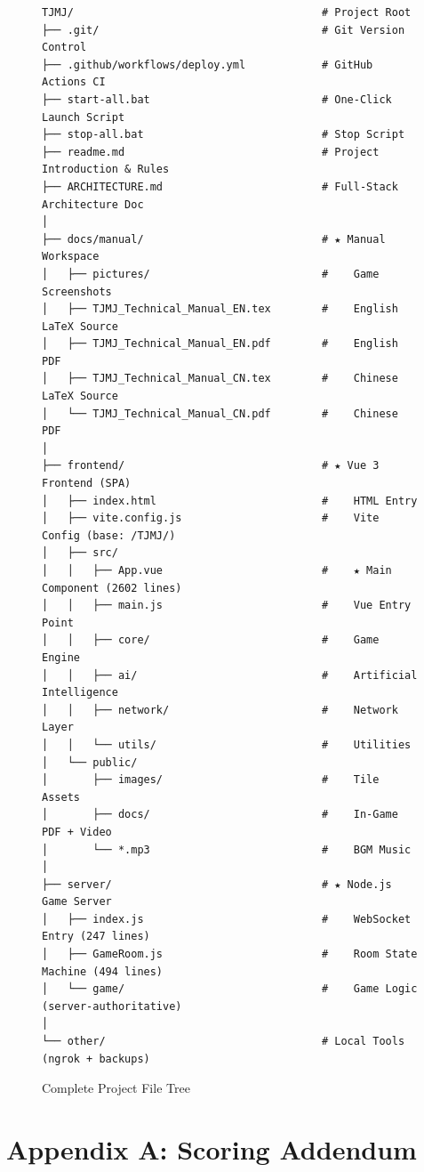 \documentclass[11pt,a4paper]{article}
\begin{document}
\begin{figure}[H]
\centering
\small
\begin{verbatim}
TJMJ/                                       # Project Root
├── .git/                                   # Git Version Control
├── .github/workflows/deploy.yml            # GitHub Actions CI
├── start-all.bat                           # One-Click Launch Script
├── stop-all.bat                            # Stop Script
├── readme.md                               # Project Introduction & Rules
├── ARCHITECTURE.md                         # Full-Stack Architecture Doc
│
├── docs/manual/                            # ★ Manual Workspace
│   ├── pictures/                           #    Game Screenshots
│   ├── TJMJ_Technical_Manual_EN.tex        #    English LaTeX Source
│   ├── TJMJ_Technical_Manual_EN.pdf        #    English PDF
│   ├── TJMJ_Technical_Manual_CN.tex        #    Chinese LaTeX Source
│   └── TJMJ_Technical_Manual_CN.pdf        #    Chinese PDF
│
├── frontend/                               # ★ Vue 3 Frontend (SPA)
│   ├── index.html                          #    HTML Entry
│   ├── vite.config.js                      #    Vite Config (base: /TJMJ/)
│   ├── src/
│   │   ├── App.vue                         #    ★ Main Component (2602 lines)
│   │   ├── main.js                         #    Vue Entry Point
│   │   ├── core/                           #    Game Engine
│   │   ├── ai/                             #    Artificial Intelligence
│   │   ├── network/                        #    Network Layer
│   │   └── utils/                          #    Utilities
│   └── public/
│       ├── images/                         #    Tile Assets
│       ├── docs/                           #    In-Game PDF + Video
│       └── *.mp3                           #    BGM Music
│
├── server/                                 # ★ Node.js Game Server
│   ├── index.js                            #    WebSocket Entry (247 lines)
│   ├── GameRoom.js                         #    Room State Machine (494 lines)
│   └── game/                               #    Game Logic (server-authoritative)
│
└── other/                                  # Local Tools (ngrok + backups)
\end{verbatim}
\caption{Complete Project File Tree}
\label{fig:tree}
\end{figure}

\newpage
\section*{Appendix A: Scoring Addendum}
\end{document}
